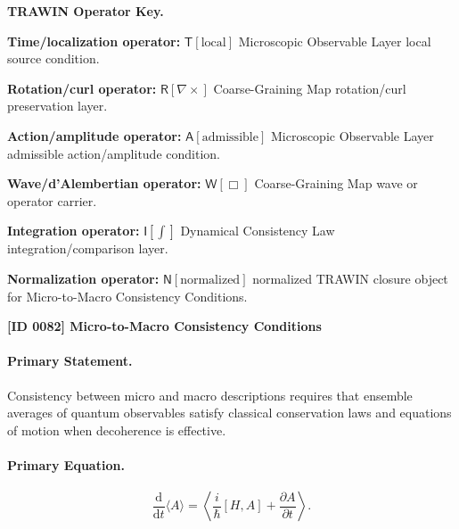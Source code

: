 \par\vspace{0.45\baselineskip}
\noindent\begin{minipage}[t]{\linewidth}
\begingroup
\small
\raggedright
\textbf{TRAWIN Operator Key.}\par
\noindent\textbf{Time/localization operator:} $\mathsf{T}\!\left[\mathrm{local}\right]$ Microscopic Observable Layer local source condition.\par
\noindent\textbf{Rotation/curl operator:} $\mathsf{R}\!\left[\nabla\times\right]$ Coarse-Graining Map rotation/curl preservation layer.\par
\noindent\textbf{Action/amplitude operator:} $\mathsf{A}\!\left[\mathrm{admissible}\right]$ Microscopic Observable Layer admissible action/amplitude condition.\par
\noindent\textbf{Wave/d'Alembertian operator:} $\mathsf{W}\!\left[\Box\right]$ Coarse-Graining Map wave or operator carrier.\par
\noindent\textbf{Integration operator:} $\mathsf{I}\!\left[\int\right]$ Dynamical Consistency Law integration/comparison layer.\par
\noindent\textbf{Normalization operator:} $\mathsf{N}\!\left[\mathrm{normalized}\right]$ normalized TRAWIN closure object for Micro-to-Macro Consistency Conditions.\par
\endgroup
\end{minipage}

\clearpage
\noindent\textbf{[ID 0082] Micro-to-Macro Consistency Conditions}\par
\vspace{0.35em}
\paragraph{Primary Statement.}
Consistency between micro and macro descriptions requires that ensemble averages of quantum observables satisfy classical conservation laws and equations of motion when decoherence is effective.

\paragraph{Primary Equation.}
\begin{equation}
\frac{\mathrm{d}}{\mathrm{d}t}\langle A\rangle
=
\left\langle
\frac{i}{\hbar}[H,A]
+
\frac{\partial A}{\partial t}
\right\rangle .
\end{equation}

